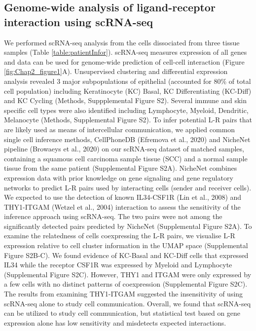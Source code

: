 \subsection{Genome-wide analysis of ligand-receptor interaction using scRNA-seq}
We performed scRNA-seq analysis from the cells dissociated from three tissue samples (Table \ref{table:patientInfor}). scRNA-seq measures expression of all genes and data can be used for genome-wide prediction of cell-cell interaction (Figure \ref{fig:Chap2_figure1}A). Unsupervised clustering and differential expression analysis revealed 3 major subpopulations of epithelial (accounted for 80\% of total cell population) including Keratinocyte (KC) Basal, KC Differentiating (KC-Diff) and KC Cycling (Methods, Suppplemental Figure S2). Several immune and skin specific cell types were also identified including Lymphocyte, Myeloid, Dendritic, Melanocyte (Methods, Supplemental Figure S2). To infer potential L-R pairs that are likely used as means of intercellular communication, we applied common single cell inference methods, CellPhoneDB  (Efremova et al., 2020) and NicheNet pipeline (Browaeys et al., 2020) on our scRNA-seq dataset of matched samples, containing a squamous cell carcinoma sample tissue (SCC)  and a normal sample tissue from the same patient (Supplemental Figure S2A). NicheNet combines expression data with prior knowledge on gene signaling and gene regulatory networks to predict L-R pairs used by interacting cells (sender and receiver cells). We expected to use the detection of known IL34-CSF1R (Lin et al., 2008) and THY1-ITGAM (Wetzel et al., 2004) interaction to assess the sensitivity of the inference approach using scRNA-seq. The two pairs were not among the significantly detected pairs predicted by NicheNet (Supplemental Figure S2A). To examine the relatedness of cells coexpressing the L-R pairs, we visualise L-R expression relative to cell cluster information in the UMAP space (Supplemental Figure S2B-C). We found evidence of KC-Basal and KC-Diff cells that expressed IL34 while the receptor CSF1R was expressed by Myeloid and Lymphocyte (Supplemental Figure S2C). However, THY1 and ITGAM were only expressed by a few cells with no distinct patterns of coexpression (Supplemental Figure S2C). The results from examining THY1-ITGAM suggested the insensitivity of using scRNA-seq alone to study cell communication. Overall, we found that scRNA-seq can be utilized to study cell communication, but statistical test based on gene expression alone has low sensitivity and misdetects expected interactions.  

